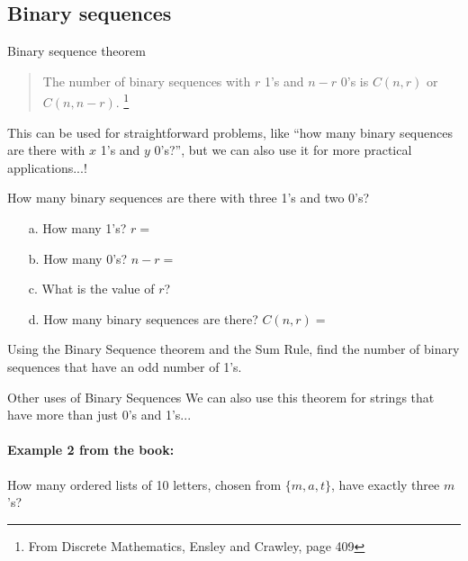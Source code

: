 {    \newpage
    
    \subsection{Binary sequences}

    \begin{intro}{Binary sequence theorem}
        \begin{quote}
			The number of binary sequences with $r$ 1's and $n-r$ 0's is $C(n,r)$ or $C(n, n-r)$.
			\footnote{From Discrete Mathematics, Ensley and Crawley, page 409}
        \end{quote}
        
        This can be used for straightforward problems, like ``how many binary sequences are there
        with $x$ 1's and $y$ 0's?'', but we can also use it for more practical applications...!
    \end{intro}

    \begin{questionNOGRADE}{\thequestion}
        How many binary sequences are there with three 1's and two 0's?
        
        \begin{enumerate}
	        \item[a.]	How many 1's? $r = $
	        \item[b.]	How many 0's? $n-r = $
	        \item[c.]	What is the value of $r$?
	        \item[d.]	How many binary sequences are there? $C(n,r) = $
		\end{enumerate}
    \end{questionNOGRADE}
    
    \hrulefill
       
    \begin{questionNOGRADE}{\thequestion}
	    Using the Binary Sequence theorem and the Sum Rule, find the number
	    of binary sequences that have an odd number of 1's.
	\end{questionNOGRADE}
	
	\newpage
	
	\begin{intro}{Other uses of Binary Sequences}
		We can also use this theorem for strings that have more than just 0's and 1's...
		
		\paragraph{Example 2 from the book:} How many ordered lists of 10 letters, chosen from $\{m, a, t\}$, 
		have exactly three $m$'s?
		

\end{intro}}
